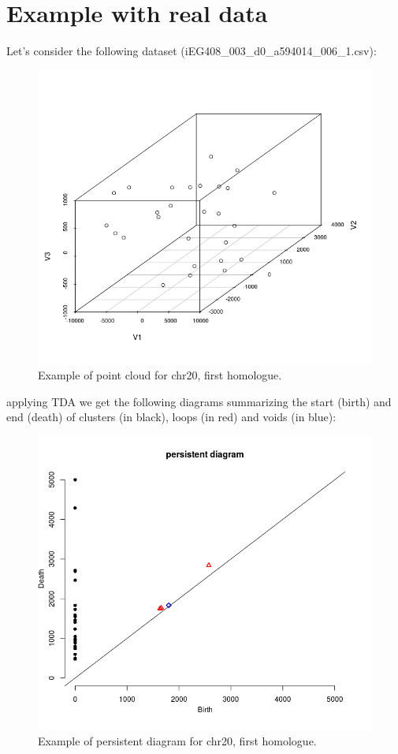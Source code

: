 \documentclass[12pt,a4paper]{article}
\begin{document}
\section{Example with real data}
Let's consider the following dataset (iEG408\_003\_d0\_a594\/014\_006\_1.csv):
\begin{figure}[hbtp]
\centering
\includegraphics[scale=0.75]{a594_014_006_1.png}
\caption{Example of point cloud for chr20, first homologue.}
\label{pointcloud}
\end{figure}
applying TDA we get the following diagrams summarizing the start (birth) and end (death) of clusters (in black), loops (in red) and voids (in blue):
\begin{figure}[hbtp]
\centering
\includegraphics[scale=0.75]{p_dia.png}
\caption{Example of persistent diagram for chr20, first homologue.}
\end{figure}
\end{document}
